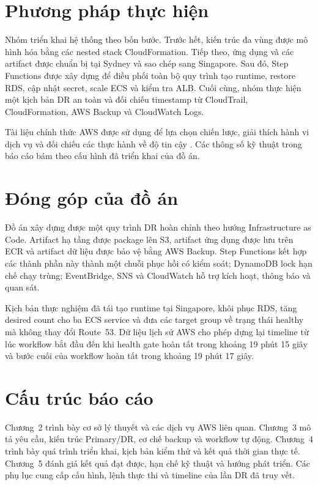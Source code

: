 \section{Phương pháp thực hiện}

Nhóm triển khai hệ thống theo bốn bước. Trước hết, kiến trúc đa vùng được mô hình hóa bằng các nested stack CloudFormation. Tiếp theo, ứng dụng và các artifact được chuẩn bị tại Sydney và sao chép sang Singapore. Sau đó, Step Functions được xây dựng để điều phối toàn bộ quy trình tạo runtime, restore RDS, cập nhật secret, scale ECS và kiểm tra ALB. Cuối cùng, nhóm thực hiện một kịch bản DR an toàn và đối chiếu timestamp từ CloudTrail, CloudFormation, AWS Backup và CloudWatch Logs.

Tài liệu chính thức AWS được sử dụng để lựa chọn chiến lược, giải thích hành vi dịch vụ và đối chiếu các thực hành về độ tin cậy \cite{aws-dr-options,aws-well-architected-reliability}. Các thông số kỹ thuật trong báo cáo bám theo cấu hình đã triển khai của đồ án.

\section{Đóng góp của đồ án}

Đồ án xây dựng được một quy trình DR hoàn chỉnh theo hướng Infrastructure as Code. Artifact hạ tầng được package lên S3, artifact ứng dụng được lưu trên ECR và artifact dữ liệu được bảo vệ bằng AWS Backup. Step Functions kết hợp các thành phần này thành một chuỗi phục hồi có kiểm soát; DynamoDB lock hạn chế chạy trùng; EventBridge, SNS và CloudWatch hỗ trợ kích hoạt, thông báo và quan sát.

Kịch bản thực nghiệm đã tái tạo runtime tại Singapore, khôi phục RDS, tăng desired count cho ba ECS service và đưa các target group về trạng thái healthy mà không thay đổi Route~53. Dữ liệu lịch sử AWS cho phép dựng lại timeline từ lúc workflow bắt đầu đến khi health gate hoàn tất trong khoảng 19 phút 15 giây và bước cuối của workflow hoàn tất trong khoảng 19 phút 17 giây.

\section{Cấu trúc báo cáo}

Chương~2 trình bày cơ sở lý thuyết và các dịch vụ AWS liên quan. Chương~3 mô tả yêu cầu, kiến trúc Primary/DR, cơ chế backup và workflow tự động. Chương~4 trình bày quá trình triển khai, kịch bản kiểm thử và kết quả thời gian thực tế. Chương~5 đánh giá kết quả đạt được, hạn chế kỹ thuật và hướng phát triển. Các phụ lục cung cấp cấu hình, lệnh thực thi và timeline của lần DR đã truy vết.
